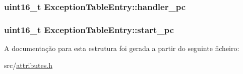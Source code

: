 \subsubsection[{\texorpdfstring{handler\+\_\+pc}{handler_pc}}]{\setlength{\rightskip}{0pt plus 5cm}uint16\+\_\+t Exception\+Table\+Entry\+::handler\+\_\+pc}\hypertarget{structExceptionTableEntry_a3fd0ed5cca1781e941594ef0af475add}{}\label{structExceptionTableEntry_a3fd0ed5cca1781e941594ef0af475add}
\subsubsection[{\texorpdfstring{start\+\_\+pc}{start_pc}}]{\setlength{\rightskip}{0pt plus 5cm}uint16\+\_\+t Exception\+Table\+Entry\+::start\+\_\+pc}\hypertarget{structExceptionTableEntry_a2b590ee5474b087686f851f10e3f8f06}{}\label{structExceptionTableEntry_a2b590ee5474b087686f851f10e3f8f06}


A documentação para esta estrutura foi gerada a partir do seguinte ficheiro\+:\begin{DoxyCompactItemize}
\item 
src/\hyperlink{attributes_8h}{attributes.\+h}\end{DoxyCompactItemize}
